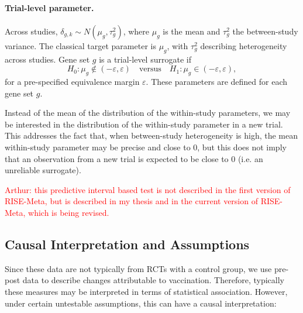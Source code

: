 \documentclass{article}
\begin{document}
\paragraph{Trial-level parameter.} Across studies, $\delta_{g,k} \sim N(\mu_g, \tau_g^2)$, where $\mu_g$ is the mean and $\tau_g^2$ the between-study variance. The classical target parameter is $\mu_g$, with $\tau_g^2$ describing heterogeneity across studies. Gene set $g$ is a trial-level surrogate if
\[
H_0: \mu_g \notin (-\varepsilon, \varepsilon) \quad \text{versus} \quad H_1: \mu_g \in (-\varepsilon, \varepsilon),
\]
for a pre-specified equivalence margin $\varepsilon$. These parameters are defined for each gene set $g$.

Instead of the mean of the distribution of the within-study parameters, we may be interested in the distribution of the within-study parameter in a new trial. This addresses the fact that, when between-study heterogeneity is high, the mean within-study parameter may be precise and close to 0, but this does not imply that an observation from a new trial is expected to be close to 0 (i.e. an unreliable surrogate).

\textcolor{red}{Arthur: this predictive interval based test is not described in the first version of RISE-Meta, but is described in my thesis and in the current version of RISE-Meta, which is being revised.}

\subsection*{Causal Interpretation and Assumptions}

Since these data are not typically from RCTs with a control group, we use pre-post data to describe changes attributable to vaccination. Therefore, typically these measures may be interpreted in terms of statistical association. However, under certain untestable assumptions, this can have a causal interpretation:
\end{document}
